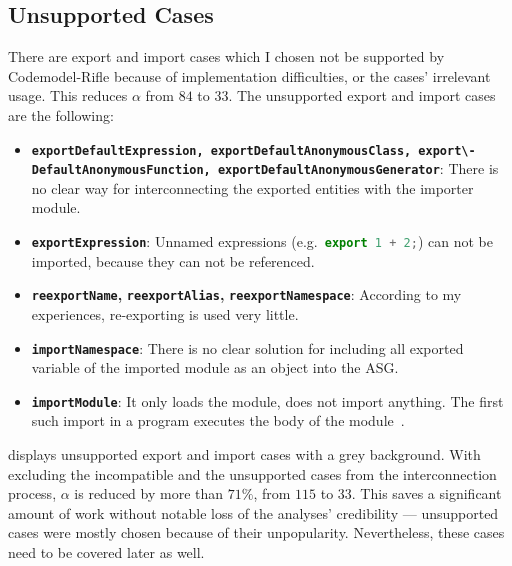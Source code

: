 \subsection{Unsupported Cases}

There are export and import cases which I chosen not be supported by Codemodel-Rifle because of implementation difficulties, or the cases' irrelevant usage. This reduces $\alpha$ from $84$ to $33$. The unsupported export and import cases are the following:

\begin{itemize}
\item \textbf{\lstinline{exportDefaultExpression, exportDefaultAnonymousClass, export\- DefaultAnonymousFunction, exportDefaultAnonymousGenerator}}: There is no clear way for interconnecting the exported entities with the importer module.
\item \textbf{\lstinline{exportExpression}}: Unnamed expressions (e.g.\ \lstinline[language=JavaScript]{export 1 + 2;}) can not be imported, because they can not be referenced.
\item \textbf{\lstinline{reexportName},} \textbf{\lstinline{reexportAlias},} \textbf{\lstinline{reexportNamespace}}: According to my experiences, re-exporting is used very little.
\item \textbf{\lstinline{importNamespace}}: There is no clear solution for including all exported variable of the imported module as an object into the ASG.
\item \textbf{\lstinline{importModule}}: It only loads the module, does not import anything. The first such import in a program executes the body of the module~\cite{exploringes6}.
\end{itemize}

 displays unsupported export and import cases with a grey background. With excluding the incompatible and the unsupported cases from the interconnection process, $\alpha$ is reduced by more than $71\%$, from $115$ to $33$. This saves a significant amount of work without notable loss of the analyses' credibility — unsupported cases were mostly chosen because of their unpopularity. Nevertheless, these cases need to be covered later as well.

